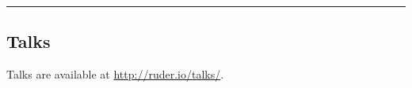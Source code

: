 \documentclass[10pt,letterpaper]{article}
\begin{document}
\hrule
\vspace{-0.4em}
\subsection*{Talks}

Talks are available at \url{http://ruder.io/talks/}.

%	
%	
%	
%	
%	
%	
%		
%	
%	
%	
%	
%	
%	
\end{document}
